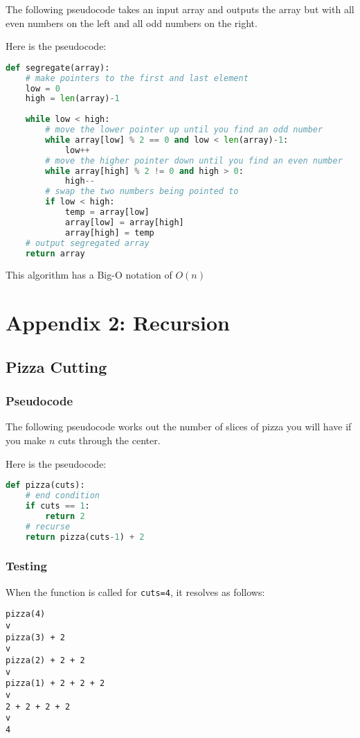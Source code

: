 \documentclass{report}
\begin{document}
The following pseudocode takes an input array and outputs the array but with all even numbers on the left and all odd numbers on the right.

Here is the pseudocode:
\begin{lstlisting}[language=Python]
def segregate(array):
    # make pointers to the first and last element
    low = 0
    high = len(array)-1
    
    while low < high:
        # move the lower pointer up until you find an odd number
        while array[low] % 2 == 0 and low < len(array)-1:
            low++
        # move the higher pointer down until you find an even number
        while array[high] % 2 != 0 and high > 0:
            high--
        # swap the two numbers being pointed to
        if low < high:
            temp = array[low]
            array[low] = array[high]
            array[high] = temp
    # output segregated array
    return array
\end{lstlisting}
This algorithm has a Big-O notation of $O(n)$

\chapter*{Appendix 2: Recursion}
\section*{Pizza Cutting}
\subsection*{Pseudocode}
The following pseudocode works out the number of slices of pizza you will have if you make $n$ cuts through the center.

Here is the pseudocode:
\begin{lstlisting}[language=Python]
def pizza(cuts):
    # end condition
    if cuts == 1:
        return 2
    # recurse
    return pizza(cuts-1) + 2
\end{lstlisting}
\subsection*{Testing}
When the function is called for \texttt{cuts=4}, it resolves as follows:
\begin{lstlisting}
pizza(4)
v
pizza(3) + 2
v
pizza(2) + 2 + 2
v
pizza(1) + 2 + 2 + 2
v
2 + 2 + 2 + 2
v
4
\end{lstlisting}
\end{document}
